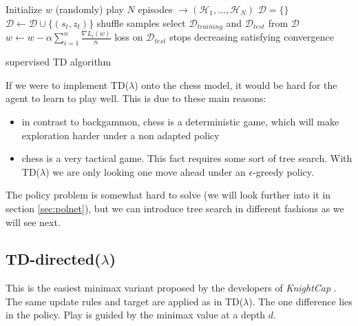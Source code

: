 \begin{algorithm}
\begin{algorithmic}
	\STATE Initialize $w$ (randomly)
	\REPEAT
		\STATE play $N$ episodes $\rightarrow (\mathcal{H}_1,\dotso,\mathcal{H}_N)$
		\STATE $\mathcal{D}=\{\}$
				\STATE$\mathcal{D} \leftarrow \mathcal{D} \cup \{(s_t,z_t)\}$
			\ENDFOR
		\ENDFOR
		\STATE shuffle samples
		\STATE select $\mathcal{D}_{training}$ and $\mathcal{D}_{test}$ from  $\mathcal{D}$
		\REPEAT		
				\STATE $w \gets w-\alpha\sum_{i=1}^{n}\frac{\nabla L_i(w)}{n}$
			\ENDFOR
		\UNTIL loss on $\mathcal{D}_{test}$ stops decreasing
	\UNTIL satisfying convergence
\end{algorithmic}
\caption{supervised TD algorithm}
\label{al:sltd}
\end{algorithm}

If we were to implement TD($\lambda$) onto the chess model, it would be hard for the agent to learn to play well. This is due to these main reasons:
\begin{itemize}
\item in contrast to backgammon, chess is a deterministic game, which will make exploration harder under a non adapted policy
\item chess is a very tactical game. This fact requires some sort of tree search. With TD($\lambda$) we are only looking one move ahead under an $\epsilon$-greedy policy.
\end{itemize}
The policy problem is somewhat hard to solve (we will look further into it in section \ref{sec:polnet}), but we can introduce tree search in different fashions as we will see next. 

\subsection{TD-directed($\lambda$)}
\label{subsec:tddir}
This is the easiest minimax variant proposed by the developers of \textit{KnightCap} \cite{baxt99}. The same update rules and target are applied as in TD($\lambda$). The one difference lies in the policy. Play is guided by the minimax value at a depth $d$.


